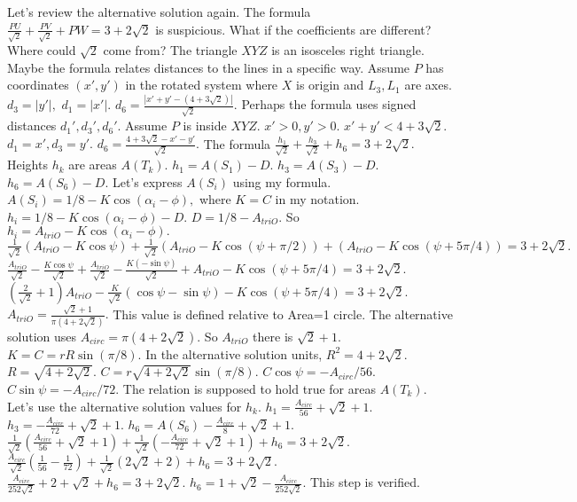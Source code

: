 Let's review the alternative solution again. The formula $\frac{PU}{\sqrt{2}} + \frac{PV}{\sqrt{2}} + PW = 3+2\sqrt2$ is suspicious. What if the coefficients are different? Where could $\sqrt{2}$ come from? The triangle $XYZ$ is an isosceles right triangle. Maybe the formula relates distances to the lines in a specific way. Assume $P$ has coordinates $(x', y')$ in the rotated system where $X$ is origin and $L_3, L_1$ are axes. 
$d_3 = |y'|,$ $d_1 = |x'|.$ $d_6 = \frac{|x'+y'-(4+3\sqrt{2})|}{\sqrt{2}}.$ 
Perhaps the formula uses signed distances $d_1', d_3', d_6'$. Assume $P$ is inside $XYZ.$ $x'>0, y'>0.$ $x'+y' < 4+3\sqrt{2}.$ 
$d_1=x', d_3=y'.$ $d_6 = \frac{4+3\sqrt{2}-x'-y'}{\sqrt{2}}.$ 
The formula $\frac{h_1}{\sqrt{2}} + \frac{h_3}{\sqrt{2}} + h_6 = 3+2\sqrt{2}.$ 
Heights $h_k$ are areas $A(T_k).$ 
$h_1 = A(S_1) - D.$ $h_3 = A(S_3) - D.$ $h_6 = A(S_6) - D.$ 
Let's express $A(S_i)$ using my formula. $A(S_i) = 1/8 - K \cos(\alpha_i - \phi),$ where $K=C$ in my notation. 
$h_i = 1/8 - K \cos(\alpha_i - \phi) - D.$ 
$D = 1/8 - A_{triO}.$ So $h_i = A_{triO} - K \cos(\alpha_i - \phi).$ 
$\frac{1}{\sqrt{2}} (A_{triO} - K \cos \psi) + \frac{1}{\sqrt{2}} (A_{triO} - K \cos(\psi+\pi/2)) + (A_{triO} - K \cos(\psi+5\pi/4)) = 3+2\sqrt{2}.$ 
$\frac{A_{triO}}{\sqrt{2}} - \frac{K \cos \psi}{\sqrt{2}} + \frac{A_{triO}}{\sqrt{2}} - \frac{K (-\sin \psi)}{\sqrt{2}} + A_{triO} - K \cos(\psi+5\pi/4) = 3+2\sqrt{2}.$ 
$(\frac{2}{\sqrt{2}}+1) A_{triO} - \frac{K}{\sqrt{2}}(\cos\psi - \sin\psi) - K \cos(\psi+5\pi/4) = 3+2\sqrt{2}.$ 
$A_{triO} = \frac{\sqrt{2}+1}{\pi(4+2\sqrt{2})}.$ This value is defined relative to Area=1 circle. The alternative solution uses $A_{circ}=\pi(4+2\sqrt{2}).$ So $A_{triO}$ there is $\sqrt{2}+1.$ 
$K=C=rR \sin(\pi/8).$ In the alternative solution units, $R^2=4+2\sqrt{2}.$ $R=\sqrt{4+2\sqrt{2}}.$ $C = r \sqrt{4+2\sqrt{2}} \sin(\pi/8).$ 
$C \cos \psi = - A_{circ}/56.$ $C \sin \psi = - A_{circ}/72.$ 
The relation is supposed to hold true for areas $A(T_k).$ Let's use the alternative solution values for $h_k.$ 
$h_1 = \frac{A_{circ}}{56} + \sqrt{2}+1.$ $h_3 = -\frac{A_{circ}}{72} + \sqrt{2}+1.$ $h_6 = A(S_6) - \frac{A_{circ}}{8} + \sqrt{2}+1.$ 
$\frac{1}{\sqrt{2}} (\frac{A_{circ}}{56} + \sqrt{2}+1) + \frac{1}{\sqrt{2}} (-\frac{A_{circ}}{72} + \sqrt{2}+1) + h_6 = 3+2\sqrt{2}.$ 
$\frac{A_{circ}}{\sqrt{2}} (\frac{1}{56}-\frac{1}{72}) + \frac{1}{\sqrt{2}}(2\sqrt{2}+2) + h_6 = 3+2\sqrt{2}.$ 
$\frac{A_{circ}}{252\sqrt{2}} + 2+\sqrt{2} + h_6 = 3+2\sqrt{2}.$ 
$h_6 = 1+\sqrt{2} - \frac{A_{circ}}{252\sqrt{2}}.$ This step is verified.

